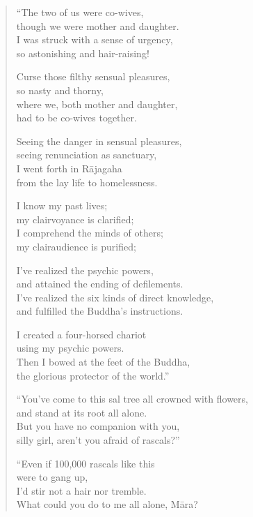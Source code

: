 \documentclass[12pt,openany]{book}%
\begin{document}
\begin{verse}%
“The two of us were co-wives, \\
though we were mother and daughter. \\
I was struck with a sense of urgency, \\
so astonishing and hair-raising! 

Curse those filthy sensual pleasures, \\
so nasty and thorny, \\
where we, both mother and daughter, \\
had to be co-wives together. 

Seeing the danger in sensual pleasures, \\
seeing renunciation as sanctuary, \\
I went forth in \textsanskrit{Rājagaha} \\
from the lay life to homelessness. 

I know my past lives; \\
my clairvoyance is clarified; \\
I comprehend the minds of others; \\
my clairaudience is purified; 

I've realized the psychic powers, \\
and attained the ending of defilements. \\
I’ve realized the six kinds of direct knowledge, \\
and fulfilled the Buddha’s instructions. 

I created a four-horsed chariot \\
using my psychic powers. \\
Then I bowed at the feet of the Buddha, \\
the glorious protector of the world.” 

“You’ve come to this sal tree all crowned with flowers, \\
and stand at its root all alone. \\
But you have no companion with you, \\
silly girl, aren’t you afraid of rascals?” 

“Even if 100,000 rascals like this \\
were to gang up, \\
I’d stir not a hair nor tremble. \\
What could you do to me all alone, \textsanskrit{Māra}? 


\end{verse}
\end{document}
